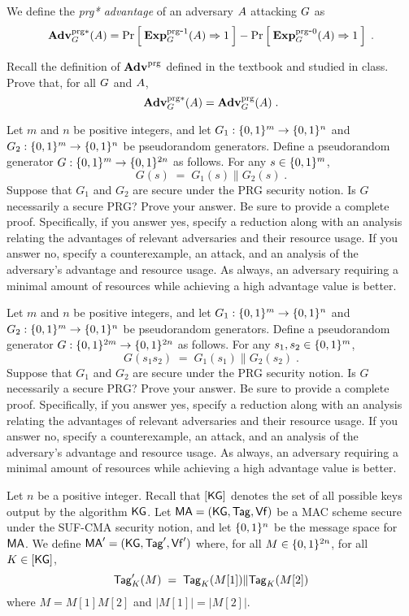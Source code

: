 \documentclass{exam}
\begin{document}
\begin{questions}
{{      \bigskip
      \noindent We define the \textit{prg* advantage} of an
      adversary $A$ attacking $G$ as
      \[
      \mathbf{Adv}^{\mathrm{prg*}}_{G}(A) = \Pr\left[\: \mathbf{Exp}^{\mathrm{prg}\mbox{-}1}_{G}(A) \Rightarrow 1 \:\right] -  \Pr\left[\: \mathbf{Exp}^{\mathrm{prg}\mbox{-}0}_{G}(A) \Rightarrow 1 \:\right]  \;.
      \]
    }
  }

  Recall the definition of $\mathbf{Adv}^{\mathrm{prg}}$ defined in the textbook and studied in class. Prove that, for all $G$ and $A$, 
  \[ \mathbf{Adv}^{\mathrm{prg*}}_{G}(A) = \mathbf{Adv}^{\mathrm{prg}}_{G}(A)\;. \]


  \question Let $m$ and $n$ be positive integers, and let $G_1:\{0,1\}^m \rightarrow \{0,1\}^n$ and $G_2:\{0,1\}^m \rightarrow \{0,1\}^n$ be pseudorandom generators. Define a pseudorandom generator $G: \{0,1\}^m \rightarrow \{0,1\}^{2n}$ as follows. For any $s \in \{0,1\}^m$,
  \[ G(s) \;=\; G_1(s) \| G_2(s)\;. \]
  Suppose that $G_1$ and $G_2$ are secure under the PRG security notion. Is $G$ necessarily a secure PRG? Prove your answer. Be sure to provide a complete proof. Specifically, if you answer yes, specify a reduction along with an analysis relating the advantages of relevant adversaries and their resource usage. If you answer no, specify a counterexample, an attack, and an analysis of the adversary's advantage and resource usage. As always, an adversary requiring a minimal amount of resources while achieving a high advantage value is better.

  \question Let $m$ and $n$ be positive integers, and let $G_1:\{0,1\}^m \rightarrow \{0,1\}^n$ and $G_2:\{0,1\}^m \rightarrow \{0,1\}^n$ be pseudorandom generators. Define a pseudorandom generator $G: \{0,1\}^{2m} \rightarrow \{0,1\}^{2n}$ as follows. For any $s_1,s_2 \in \{0,1\}^m$,
  \[ G(s_1s_2) \;=\; G_1(s_1) \| G_2(s_2)\;. \]
  Suppose that $G_1$ and $G_2$ are secure under the PRG security notion. Is $G$ necessarily a secure PRG? Prove your answer. Be sure to provide a complete proof. Specifically, if you answer yes, specify a reduction along with an analysis relating the advantages of relevant adversaries and their resource usage. If you answer no, specify a counterexample, an attack, and an analysis of the adversary's advantage and resource usage. As always, an adversary requiring a minimal amount of resources while achieving a high advantage value is better.


  \question Let $n$ be a positive integer. Recall that $[\mathsf{KG}]$ denotes the set of all possible keys output by the algorithm $\mathsf{KG}$. Let $\mathsf{MA} = (\mathsf{KG},\mathsf{Tag},\mathsf{Vf})$ be a MAC scheme secure under the SUF-CMA security notion, and let $\{0,1\}^n$ be the message space for $\mathsf{MA}$. We define $\mathsf{MA}' = (\mathsf{KG},\mathsf{Tag}',\mathsf{Vf}')$ where, for all $M \in \{0,1\}^{2n}$, for all $K \in [\mathsf{KG}]$,
  \[ \mathsf{Tag}'_K(M)  \;=\;  \mathsf{Tag}_K( M[1]) \| \mathsf{Tag}_K( M[2] )  \]
  where $M = M[1]M[2]$ and $|M[1]| = |M[2]|$.
  \begin{parts}

\end{parts}
\end{questions}
\end{document}
